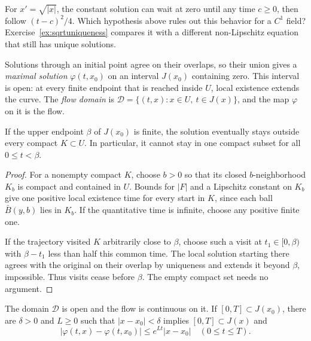 \begin{think}
For $x'=\sqrt{|x|}$, the constant solution can wait at zero until any time $c\ge0$, then follow $(t-c)^2/4$. Which hypothesis above rules out this behavior for a $C^1$ field? Exercise~\ref{ex:sqrtuniqueness} compares it with a different non-Lipschitz equation that still has unique solutions.
\end{think}

Solutions through an initial point agree on their overlaps, so their union gives a \emph{maximal solution} $\varphi(t,x_0)$ on an interval $J(x_0)$ containing zero. This interval is open: at every finite endpoint that is reached inside $U$, local existence extends the curve. The \emph{flow domain} is $\mathcal D=\{(t,x):x\in U,\ t\in J(x)\}$, and the map $\varphi$ on it is the flow.

\begin{proposition}\label{prop:escape}
If the upper endpoint $\beta$ of $J(x_0)$ is finite, the solution eventually stays outside every compact $K\subset U$. In particular, it cannot stay in one compact subset for all $0\le t<\beta$.
\end{proposition}

\begin{proof}
For a nonempty compact $K$, choose $b>0$ so that its closed $b$-neighborhood $K_b$ is compact and contained in $U$. Bounds for $|F|$ and a Lipschitz constant on $K_b$ give one positive local existence time for every start in $K$, since each ball $\bar B(y,b)$ lies in $K_b$. If the quantitative time is infinite, choose any positive finite one.

If the trajectory visited $K$ arbitrarily close to $\beta$, choose such a visit at $t_1\in[0,\beta)$ with $\beta-t_1$ less than half this common time. The local solution starting there agrees with the original on their overlap by uniqueness and extends it beyond $\beta$, impossible. Thus visits cease before $\beta$. The empty compact set needs no argument.
\end{proof}

\begin{theorem}\label{thm:flowcont}
The domain $\mathcal D$ is open and the flow is continuous on it. If $[0,T]\subset J(x_0)$, there are $\delta>0$ and $L\ge0$ such that $|x-x_0|<\delta$ implies $[0,T]\subset J(x)$ and
\[
|\varphi(t,x)-\varphi(t,x_0)|\le e^{Lt}|x-x_0|\quad(0\le t\le T).
\]
\end{theorem}

